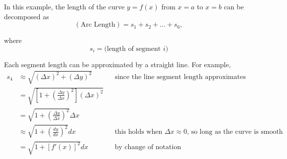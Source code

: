 \documentclass[10pt]{article}
\theoremstyle{definition}
\newcommand{\1}[1]{\textbf{1}_{\left[#1\right]}} %
\def\[{\left [}
\begin{document}







In this example, the length of the curve $y=f(x)$ from $x=a$ to $x=b$ can be decomposed as 
\begin{equation*}
  (\text{Arc Length}) = s_{1}+s_{2}+\ldots+s_{6},
\end{equation*}

where
\begin{equation*}
  s_{i} = \text{(length of segment $i$)}
\end{equation*}

Each segment length can be approximated by a straight line. For example,
\begin{align*}
  s_{4}
  &\approx \sqrt{\left( \Delta x \right)^{2} +\left( \Delta y \right)^{2} } &&\text{since the line
                                                                               segment length
                                                                               approximates the curve length}\\
  &= \sqrt{\left[ 1+\left( \frac{\Delta y}{\Delta x} \right)^{2}  \right]\left(\Delta x\right)^{2} }\\
  &= \sqrt{ 1+\left( \frac{\Delta y}{\Delta x} \right)^{2}  }\Delta x\\
  &\approx \sqrt{1+ \left( \frac{dy}{dx} \right)^{2} }dx &&\text{this holds when $\Delta x\approx
                                                            0$, so long as the curve is smooth}\\
  & = \sqrt{1 + \left[ f'(x) \right]^{2} }dx &&\text{by change of notation }
\end{align*}
\end{document}
